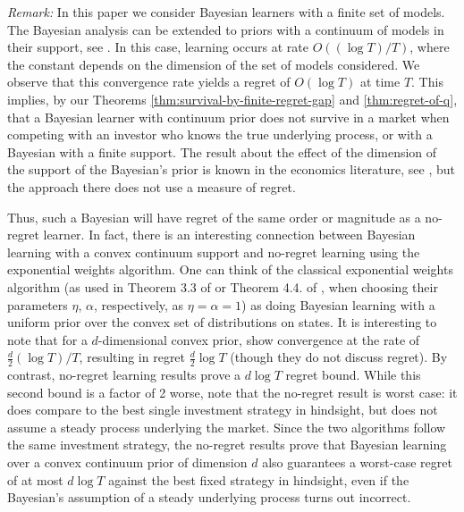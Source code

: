 \vspace{5pt}
\noindent
{\em Remark:}
In this paper we consider Bayesian learners with a finite set of models. The Bayesian analysis can be extended to priors with a continuum of models in their support, see \cite{clarkebarron1990}. In this case, learning occurs at rate 
$O((\log T)/T)$, where the constant depends on the dimension of the set of models considered. We observe that this convergence rate yields a regret of $O(\log T)$ at time $T$. This implies, by our Theorems \ref{thm:survival-by-finite-regret-gap} and \ref{thm:regret-of-q}, that a Bayesian learner with continuum prior does not survive in a market when competing with an investor who knows the true underlying process, or with a Bayesian with a finite support. 
The result about the effect of the dimension of the support of the Bayesian's prior is known in the economics literature, see \cite{blumeeasley2006}, but the approach there does not use a measure of regret. 

Thus, such a Bayesian will have regret of the same order or magnitude as a no-regret learner. In fact, there is an interesting connection between Bayesian learning with a convex continuum support and no-regret learning using the exponential weights algorithm. One can think of the classical exponential weights algorithm (as used in Theorem 3.3 of \cite{cesa2006prediction}  or Theorem 4.4. of \cite{DBLP:journals/corr/abs-1909-05207}, when choosing their parameters $\eta$, $\alpha$, respectively, as $\eta=\alpha=1$) as doing Bayesian learning with a uniform prior over the convex set of distributions on states. It is interesting to note that for a $d$-dimensional convex prior, \cite{clarkebarron1990} show convergence at the rate of $\frac{d}{2}(\log T)/T$, resulting in regret $\frac{d}{2} \log T$ (though they do not discuss regret). By contrast, no-regret learning results prove a $d \log T$ regret bound. While this second bound is a factor of 2 worse, note that the no-regret result is worst case: it does compare to the best single investment strategy in hindsight, but does not assume a steady process underlying the market. Since the two algorithms follow the same investment strategy, the no-regret results prove that Bayesian learning over a convex continuum prior of dimension $d$ also guarantees a worst-case regret of at most $d \log T$ against the best fixed strategy in hindsight, even if the Bayesian's  assumption of a steady underlying process turns out incorrect.

